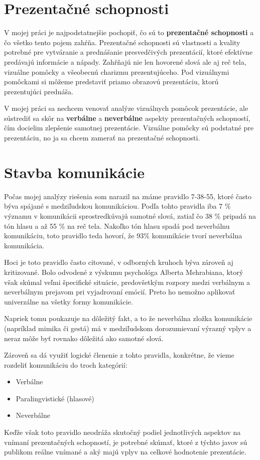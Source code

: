 \section{Prezentačné schopnosti}
V mojej práci je najpodstatnejšie pochopiť, čo sú to \textbf{prezentačné schopnosti} a čo všetko tento pojem zahŕňa. Prezentačné schopnosti sú vlastnosti a kvality potrebné pre vytváranie a prednášanie presvedčivých prezentácií, ktoré efektívne predávajú informácie a nápady\cite{presentationSkills}. Zahŕňajú nie len hovorené slová ale aj reč tela, vizuálne pomôcky a všeobecnú charizmu prezentujúceho\cite{presentationSkills}. Pod vizuálnymi pomôckami si môžeme predstaviť priamo obrazovú prezentáciu, ktorú prezentujúci prednáša.

V mojej práci sa nechcem venovať analýze vizuálnych pomôcok prezentácie, ale sústrediť sa skôr na \textbf{verbálne} a \textbf{neverbálne} aspekty prezentačných schopností, čím docielim zlepšenie samotnej prezentácie. Vizuálne pomôcky sú podstatné pre prezentáciu, no ja sa chcem zamerať na prezentačné schopnosti.

\section{Stavba komunikácie}
Počas mojej analýzy riešenia som narazil na známe pravidlo 7-38-55, ktoré často býva spájané s medziľudskou komunikáciou. Podľa tohto pravidla iba 7 \% významu v komunikácii sprostredkúvajú samotné slová, zatiaľ čo 38 \% pripadá na tón hlasu a až 55 \% na reč tela\cite{73855}. Nakoľko tón hlasu spadá pod neverbálnu komunikáciu, toto pravidlo teda hovorí, že 93\% komunikácie tvorí neverbálna komunikácia.

Hoci je toto pravidlo často citované, v odborných kruhoch býva zároveň aj kritizované. Bolo odvodené z výskumu psychológa Alberta Mehrabiana, ktorý však skúmal veľmi špecifické situácie, predovšetkým rozpory medzi verbálnym a neverbálnym prejavom pri vyjadrovaní emócií. Preto ho nemožno aplikovať univerzálne na všetky formy komunikácie\cite{73855Critic}.

Napriek tomu poukazuje na dôležitý fakt, a to že neverbálna zložka komunikácie (napríklad mimika či gestá) má v medziľudskom dorozumievaní výrazný vplyv a neraz môže byť rovnako dôležitá ako samotné slová.

Zároveň sa dá využiť logické členenie z tohto pravidla, konkrétne, že vieme rozdeliť komunikáciu do troch kategórií:
\begin{itemize}
    \item Verbálne
    \item Paralingvistické (hlasové)
    \item Neverbálne
\end{itemize}
Keďže však toto pravidlo neodráža skutočný podiel jednotlivých aspektov na vnímaní prezentačných schopností, je potrebné skúmať, ktoré z týchto javov sú publikom reálne vnímané a aký majú vplyv na celkové hodnotenie prezentácie.

